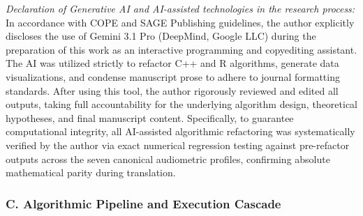 \documentclass[
  12pt,
]{article}
\begin{document}
\emph{Declaration of Generative AI and AI-assisted technologies in the
research process:} In accordance with COPE and SAGE Publishing
guidelines, the author explicitly discloses the use of Gemini 3.1 Pro
(DeepMind, Google LLC) during the preparation of this work as an
interactive programming and copyediting assistant. The AI was utilized
strictly to refactor C++ and R algorithms, generate data visualizations,
and condense manuscript prose to adhere to journal formatting standards.
After using this tool, the author rigorously reviewed and edited all
outputs, taking full accountability for the underlying algorithm design,
theoretical hypotheses, and final manuscript content. Specifically, to
guarantee computational integrity, all AI-assisted algorithmic
refactoring was systematically verified by the author via exact
numerical regression testing against pre-refactor outputs across the
seven canonical audiometric profiles, confirming absolute mathematical
parity during translation.

\subsubsection{C. Algorithmic Pipeline and Execution
Cascade}\label{c.-algorithmic-pipeline-and-execution-cascade}
\end{document}
